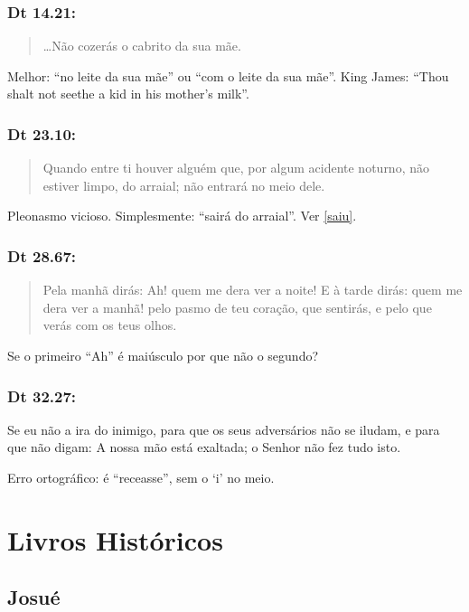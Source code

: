 \subsection{Dt 14.21:}
\begin{quote}
    \small
\ldots Não cozerás o cabrito  da sua mãe.
\end{quote}

Melhor: ``no leite da sua mãe'' ou ``com o leite da sua mãe''. King James: ``Thou shalt not seethe a kid in his mother's milk''.

\subsection{Dt 23.10:}
\begin{quote}
    \small
Quando entre ti houver alguém que, por algum acidente noturno, não estiver limpo,  do arraial; não entrará no meio dele.
\end{quote}

Pleonasmo vicioso. Simplesmente: ``sairá do arraial''. Ver \ref{saiu}.

\subsection{Dt 28.67:}
\begin{quote}
    \small
Pela manhã dirás: Ah! quem me dera ver a noite! E à tarde dirás:  quem me dera ver a manhã! pelo pasmo de teu coração, que sentirás, e pelo que verás com os teus olhos.
\end{quote}

Se o primeiro ``Ah'' é maiúsculo por que não o segundo?

\subsection{Dt 32.27:} Se eu não  a ira do inimigo, para que os seus adversários não se iludam, e para que não digam: A nossa mão está exaltada; o Senhor não fez tudo isto.

Erro ortográfico: é ``receasse'', sem o `i' no meio.

\chapter{Livros Históricos}
\section{Josué}
